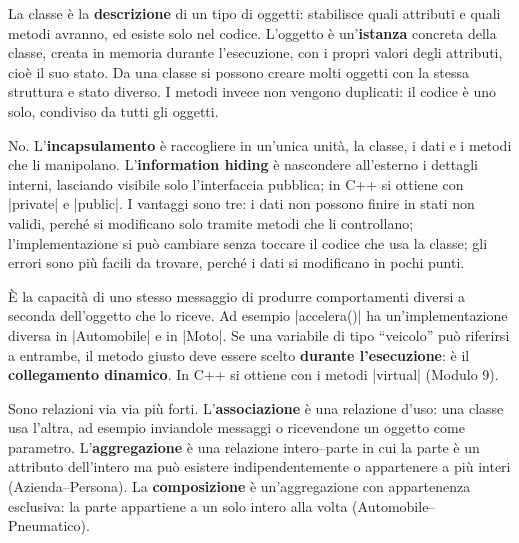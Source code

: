 \begin{orale}
La classe è la \textbf{descrizione} di un tipo di oggetti: stabilisce quali
attributi e quali metodi avranno, ed esiste solo nel codice. L'oggetto è
un'\textbf{istanza} concreta della classe, creata in memoria durante
l'esecuzione, con i propri valori degli attributi, cioè il suo stato. Da una
classe si possono creare molti oggetti con la stessa struttura e stato diverso.
I metodi invece non vengono duplicati: il codice è uno solo, condiviso da tutti
gli oggetti.
\end{orale}

\begin{orale}
No. L'\textbf{incapsulamento} è raccogliere in un'unica unità, la classe, i dati
e i metodi che li manipolano. L'\textbf{information hiding} è nascondere
all'esterno i dettagli interni, lasciando visibile solo l'interfaccia pubblica;
in C++ si ottiene con \cc|private| e \cc|public|. I vantaggi sono tre: i dati non
possono finire in stati non validi, perché si modificano solo tramite metodi
che li controllano; l'implementazione si può cambiare senza toccare il codice
che usa la classe; gli errori sono più facili da trovare, perché i dati si
modificano in pochi punti.
\end{orale}

\begin{orale}
È la capacità di uno stesso messaggio di produrre comportamenti diversi a
seconda dell'oggetto che lo riceve. Ad esempio \cc|accelera()| ha
un'implementazione diversa in \cc|Automobile| e in \cc|Moto|. Se una variabile di
tipo ``veicolo'' può riferirsi a entrambe, il metodo giusto deve essere scelto
\textbf{durante l'esecuzione}: è il \textbf{collegamento dinamico}. In C++ si
ottiene con i metodi \cc|virtual| (Modulo 9).
\end{orale}

\begin{orale}
Sono relazioni via via più forti. L'\textbf{associazione} è una relazione d'uso:
una classe usa l'altra, ad esempio inviandole messaggi o ricevendone un oggetto
come parametro. L'\textbf{aggregazione} è una relazione intero--parte in cui la
parte è un attributo dell'intero ma può esistere indipendentemente o appartenere
a più interi (Azienda--Persona). La \textbf{composizione} è un'aggregazione con
appartenenza esclusiva: la parte appartiene a un solo intero alla volta
(Automobile--Pneumatico).
\end{orale}

